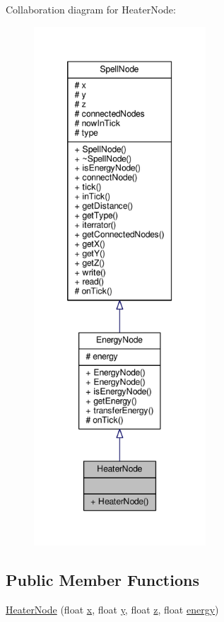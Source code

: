Collaboration diagram for Heater\-Node\-:
\nopagebreak
\begin{figure}[H]
\begin{center}
\leavevmode
\includegraphics[height=550pt]{class_heater_node__coll__graph}
\end{center}
\end{figure}
\subsection*{Public Member Functions}
\begin{DoxyCompactItemize}
\item 
\hyperlink{class_heater_node_a7c6998949929f0a43dc8e8e588a53cc0}{Heater\-Node} (float \hyperlink{class_spell_node_a916f2a709a674dd2a61530b6acc339cc}{x}, float \hyperlink{class_spell_node_a754d80fd0fd82dbc12443b5f277b9fb4}{y}, float \hyperlink{class_spell_node_aff090331ff1bd816a22e974a50c1a180}{z}, float \hyperlink{class_energy_node_ac2cd46828178316e24f339489f553852}{energy})
\end{DoxyCompactItemize}
